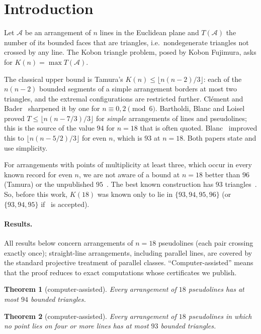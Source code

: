 \documentclass[11pt]{article}
\newtheorem{theorem}{Theorem}
\theoremstyle{definition}
\theoremstyle{remark}
\begin{document}
\section{Introduction}

Let $\mathcal A$ be an arrangement of $n$ lines in the Euclidean plane and $T(\mathcal A)$ the number of its bounded
faces that are triangles, i.e.\ nondegenerate triangles not crossed by any line. The Kobon triangle problem, posed
by Kobon Fujimura, asks for $K(n)=\max T(\mathcal A)$.

The classical upper bound is Tamura's $K(n)\le\lfloor n(n-2)/3\rfloor$: each of the $n(n-2)$ bounded segments of a
simple arrangement borders at most two triangles, and the extremal configurations are restricted further. Clément and
Bader~\cite{clementbader} sharpened it by one for $n\equiv 0,2\pmod 6$. Bartholdi, Blanc and Loisel~\cite{bbl} proved
$T\le\lfloor n(n-7/3)/3\rfloor$ for \emph{simple} arrangements of lines and pseudolines; this is the source of the
value $94$ for $n=18$ that is often quoted. Blanc~\cite{blanc} improved this to $\lfloor n(n-5/2)/3\rfloor$ for even
$n$, which is $93$ at $n=18$. Both papers state and use simplicity.

For arrangements with points of multiplicity at least three, which occur in every known record for even $n$, we are
not aware of a bound at $n=18$ better than $96$ (Tamura) or the unpublished $95$~\cite{clementbader}. The best known
construction has $93$ triangles~\cite{gallery}. So, before this work, $K(18)$ was known only to lie in $\{93,94,95,96\}$
(or $\{93,94,95\}$ if~\cite{clementbader} is accepted).

\paragraph{Results.} All results below concern arrangements of $n=18$ pseudolines (each pair crossing exactly once);
straight-line arrangements, including parallel lines, are covered by the standard projective treatment of parallel
classes. ``Computer-assisted'' means that the proof reduces to exact computations whose certificates we publish.

\begin{theorem}[computer-assisted]\label{thm:94}
Every arrangement of $18$ pseudolines has at most $94$ bounded triangles.
\end{theorem}

\begin{theorem}[computer-assisted]\label{thm:mult3}
Every arrangement of $18$ pseudolines in which no point lies on four or more lines has at most $93$ bounded triangles.
\end{theorem}
\end{document}
